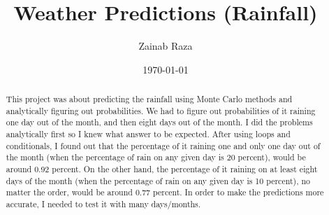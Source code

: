 \documentclass[twocolumn]{revtex4}
\begin{document}
\title{
Weather Predictions (Rainfall)
}

\author{Zainab Raza}


\date{\today}

\begin{abstract}
 
This project was about predicting the rainfall using Monte Carlo methods and analytically figuring out probabilities. We had to figure out probabilities of it raining one day out of the month, and then eight days out of the month. I did the problems analytically first so I knew what answer to be expected. After using loops and conditionals, I found out that the percentage of it raining one and only one day out of the month (when the percentage of rain on any given day is 20 percent), would be around 0.92 percent. On the other hand, the percentage of it raining on at least eight days of the month (when the percentage of rain on any given day is 10 percent), no matter the order, would be around 0.77 percent. In order to make the predictions more accurate, I needed to test it with many days/months. 
\end{abstract}


\maketitle

\end{document}
